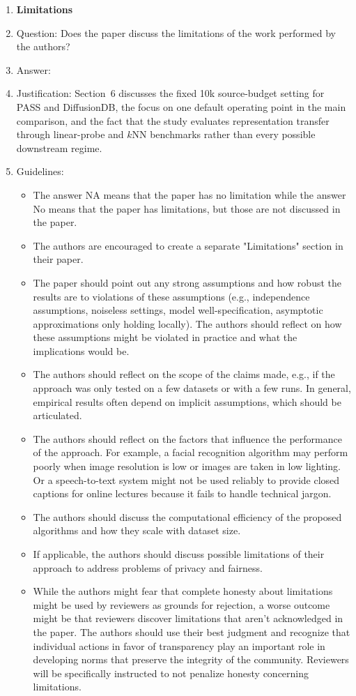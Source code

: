 \documentclass{article}
\begin{document}
\begin{enumerate}
\item {\bf Limitations}
    \item[] Question: Does the paper discuss the limitations of the work performed by the authors?
    \item[] Answer: \answerYes{}
    \item[] Justification: Section~6 discusses the fixed 10k source-budget setting for PASS and DiffusionDB, the focus on one default operating point in the main comparison, and the fact that the study evaluates representation transfer through linear-probe and $k$NN benchmarks rather than every possible downstream regime.
    \item[] Guidelines:
    \begin{itemize}
        \item The answer NA means that the paper has no limitation while the answer No means that the paper has limitations, but those are not discussed in the paper. 
        \item The authors are encouraged to create a separate "Limitations" section in their paper.
        \item The paper should point out any strong assumptions and how robust the results are to violations of these assumptions (e.g., independence assumptions, noiseless settings, model well-specification, asymptotic approximations only holding locally). The authors should reflect on how these assumptions might be violated in practice and what the implications would be.
        \item The authors should reflect on the scope of the claims made, e.g., if the approach was only tested on a few datasets or with a few runs. In general, empirical results often depend on implicit assumptions, which should be articulated.
        \item The authors should reflect on the factors that influence the performance of the approach. For example, a facial recognition algorithm may perform poorly when image resolution is low or images are taken in low lighting. Or a speech-to-text system might not be used reliably to provide closed captions for online lectures because it fails to handle technical jargon.
        \item The authors should discuss the computational efficiency of the proposed algorithms and how they scale with dataset size.
        \item If applicable, the authors should discuss possible limitations of their approach to address problems of privacy and fairness.
        \item While the authors might fear that complete honesty about limitations might be used by reviewers as grounds for rejection, a worse outcome might be that reviewers discover limitations that aren't acknowledged in the paper. The authors should use their best judgment and recognize that individual actions in favor of transparency play an important role in developing norms that preserve the integrity of the community. Reviewers will be specifically instructed to not penalize honesty concerning limitations.
    \end{itemize}


\end{enumerate}
\end{document}
